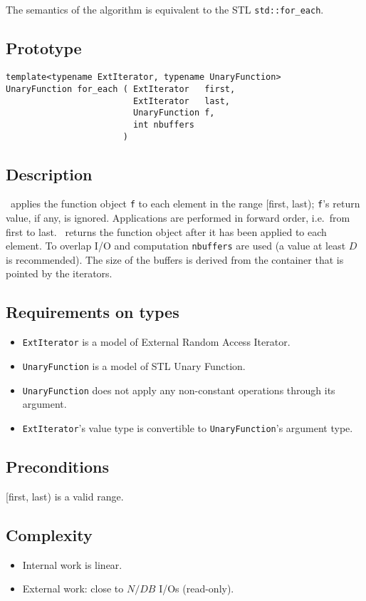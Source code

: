 \documentclass[twoside]{book}
\begin{document}
\subsection{\xforeach}
The semantics of the algorithm is equivalent to the STL
\texttt{std::for\_each}. 

\subsection*{Prototype}
\begin{lstlisting}
template<typename ExtIterator, typename UnaryFunction>
UnaryFunction for_each ( ExtIterator   first,
                         ExtIterator   last,
                         UnaryFunction f,
                         int nbuffers
                       )        
\end{lstlisting}
\subsection*{Description}
\xforeach\ applies the function object \texttt{f} to each element in the range
[first, last); \texttt{f}'s return value, if any, is
ignored. Applications are 
performed in forward order, i.e.\ from first to last. \xforeach\ returns
the function object after it has been applied to each element. 
 To
overlap I/O and computation \texttt{nbuffers} are used (a value at
least $D$ is recommended). The size of
the buffers is derived from the container that is pointed by the
iterators. 
\subsection*{Requirements on types}
\begin{itemize}
\item \texttt{ExtIterator} is a model of External Random Access
Iterator.
\item \texttt{UnaryFunction} is a model of STL Unary Function.
\item \texttt{UnaryFunction} does not apply any non-constant
operations through its argument.
\item \texttt{ExtIterator}'s value type is convertible to
\texttt{UnaryFunction}'s argument type.
\end{itemize}
\subsection*{Preconditions}
[first, last) is a valid range.
\subsection*{Complexity}
\begin{itemize}
\item Internal work is linear.
\item External work: close to $N/DB$ I/Os (read-only).
\end{itemize}
\end{document}
